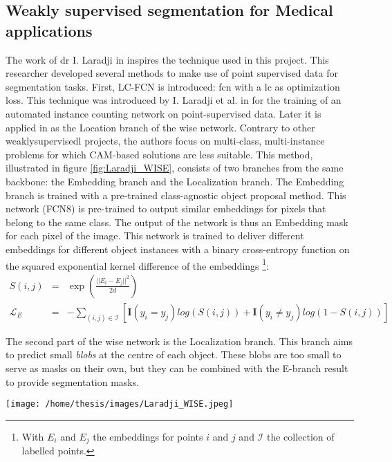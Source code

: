 \subsection{Weakly supervised segmentation for Medical applications}
\par{
    The work of dr I. Laradji in \cite{Laradji2020} inspires the technique used in this project.
    This researcher developed several methods to make use of point supervised data for segmentation tasks.
    First, LC-FCN is introduced: \acrfull{fcn} with a \acrfull{lc} as optimization loss.
    This technique was introduced by I. Laradji et al. in \cite{Laradji2018} for the training of an automated instance counting network on point-supervised data.
    Later it is applied in \cite{Laradji2020} as the Location branch of the \Gls{wise} network.
    Contrary to other \Gls{weaklysupervisedl} projects, the authors focus on multi-class, multi-instance problems for which CAM-based solutions are less suitable.
    This method, illustrated in figure \ref{fig:Laradji_WISE}, consists of two branches from the same backbone: the Embedding branch and the Localization branch.
    The Embedding branch is trained with a pre-trained class-agnostic object proposal method. 
    This network (FCN8) is pre-trained to output similar embeddings for pixels that belong to the same class.
    The output of the network is thus an Embedding mask for each pixel of the image. 
    This network is trained to deliver different embeddings for different object instances with a binary cross-entropy function on the squared exponential kernel difference of the embeddings
    \footnote{With $E_i$ and $E_j$ the embeddings for points $i$ and $j$ and $\mathcal{I}$ the collection of labelled points.}:
}
\begin{eqnarray}
    S(i,j) &=& \exp \left( \frac{||E_i-E_j||^2}{2d} \right)\\
    \mathcal{L}_E &=& - \sum_{(i,j)\in \mathcal{I}} \left[  \mathbf{I}(y_i=y_j) log(S(i,j)) + \mathbf{I}(y_i\neq y_j) log(1-S(i,j))  \right]
\end{eqnarray}
\par{
    The second part of the \Gls{wise} network is the Localization branch. 
    This branch aims to predict small \textit{blobs} at the centre of each object.
    These blobs are too small to serve as masks on their own, but they can be combined with the E-branch result to provide segmentation masks.
}
\begin{SCfigure}[][htb]
    \texttt{[image: /home/thesis/images/Laradji\_WISE.jpeg]}
    \caption{Illustration from \cite{Laradji2020}. The \Gls{wise} approach consists of two branches: The Embedding branch and the Localization branch.}
    \label{fig:Laradji_WISE}
\end{SCfigure}

